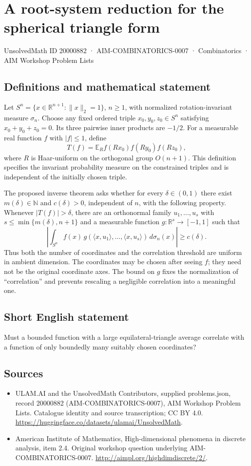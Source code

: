 \documentclass[11pt,a4paper]{article}
\begin{document}
\section*{A root-system reduction for the spherical triangle form}\label{20000882}
{\small UnsolvedMath ID 20000882 · AIM-COMBINATORICS-0007 · Combinatorics · AIM Workshop Problem Lists}
\subsection{Definitions and mathematical statement}
Let $S^n=\{x\in\mathbb R^{n+1}:\|x\|_2=1\}$, $n\geq1$, with normalized rotation-invariant measure $\sigma_n$.
Choose any fixed ordered triple $x_0,y_0,z_0\in S^n$ satisfying $x_0+y_0+z_0=0$.
Its three pairwise inner products are $-1/2$.
For a measurable real function $f$ with $|f|\leq1$, define
\[
 T(f)=\mathbb E_R f(Rx_0)f(Ry_0)f(Rz_0),
\]
where $R$ is Haar-uniform on the orthogonal group $O(n+1)$.
This definition specifies the invariant probability measure on the constrained triples and is independent of the initially chosen triple.

The proposed inverse theorem asks whether for every $\delta\in(0,1)$ there exist $m(\delta)\in\mathbb N$ and $c(\delta)>0$, independent of $n$, with the following property.
Whenever $|T(f)|>\delta$, there are an orthonormal family $u_1,\ldots,u_s$ with $s\leq\min\{m(\delta),n+1\}$ and a measurable function $g:\mathbb R^s\to[-1,1]$ such that
\[
 \left|\int_{S^n}f(x)\,
 g(\langle x,u_1\rangle,\ldots,\langle x,u_s\rangle)
 \,d\sigma_n(x)\right|\geq c(\delta).
\]
Thus both the number of coordinates and the correlation threshold are uniform in ambient dimension.
The coordinates may be chosen after seeing $f$; they need not be the original coordinate axes.
The bound on $g$ fixes the normalization of ``correlation'' and prevents rescaling a negligible correlation into a meaningful one.
\subsection{Short English statement}
Must a bounded function with a large equilateral-triangle average correlate with a function of only boundedly many suitably chosen coordinates?
\subsection{Sources}
\begin{itemize}
\item[S1] ULAM.AI and the UnsolvedMath Contributors, supplied problems.json, record 20000882 (AIM-COMBINATORICS-0007), AIM Workshop Problem Lists. Catalogue identity and source transcription; CC BY 4.0.
\url{https://huggingface.co/datasets/ulamai/UnsolvedMath}.
\item[S2] American Institute of Mathematics, High-dimensional phenomena in discrete analysis, item 2.4. Original workshop question underlying AIM-COMBINATORICS-0007.
\url{http://aimpl.org/highdimdiscrete/2/}.
\end{itemize}
\end{document}
